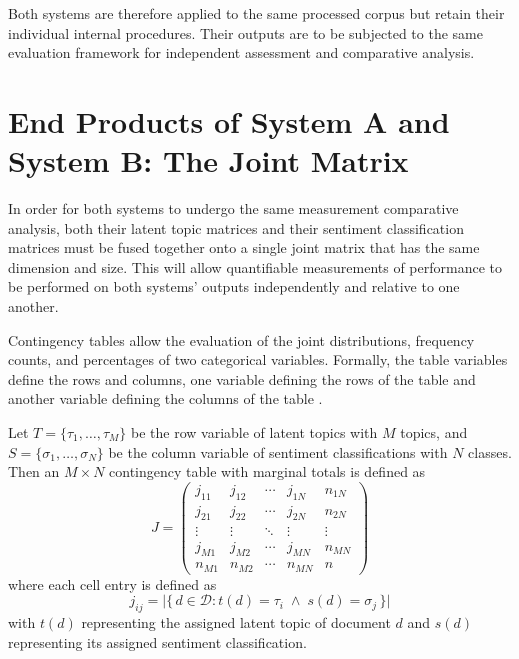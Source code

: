 \documentclass[12pt,a4paper]{report}
\newcommand{\topic}[1]{\tau_{#1}}
\newcommand{\sent}[1]{\sigma_{#1}}
\begin{document}
Both systems are therefore applied to the same processed corpus but retain their
individual internal procedures. Their outputs are to be subjected to the same
evaluation framework for independent assessment and comparative analysis.

\section{End Products of System A and System B: The Joint Matrix}

In order for both systems to undergo the same measurement comparative analysis,
both their latent topic matrices and their sentiment classification matrices
must be fused together onto a single joint matrix that has the same dimension
and size. This will allow quantifiable measurements of performance to be
performed on both systems' outputs independently and relative to one another.

Contingency tables allow the evaluation of the joint distributions, frequency
counts, and percentages of two categorical variables. Formally, the table
variables define the rows and columns, one variable defining the rows of the
table and another variable defining the columns of the table \parencite{ncssnd}.

Let $T = \{\topic{1}, \dots, \topic{M}\}$ be the row variable of latent topics
with $M$ topics, and $S = \{\sent{1}, \dots, \sent{N}\}$ be the column variable
of sentiment classifications with $N$ classes. Then an $M \times N$ contingency
table with marginal totals is defined as
\begin{equation}
  J =
  \begin{pmatrix}
    j_{11}   & j_{12}   & \cdots & j_{1N}   & n_{1N} \\
    j_{21}   & j_{22}   & \cdots & j_{2N}   & n_{2N} \\
    \vdots   & \vdots   & \ddots & \vdots   & \vdots \\
    j_{M1}   & j_{M2}   & \cdots & j_{MN}   & n_{MN} \\
    n_{M1}      & n_{M2}      & \cdots & n_{MN}      & n
  \end{pmatrix}
  \label{eq:jointmatrix}
\end{equation}
where each cell entry is defined as
\begin{equation}
  j_{ij} = \bigl|\{\, d \in \mathcal{D} : t(d) = \topic{i} \;\wedge\; s(d) = \sent{j} \,\}\bigr|
  \label{eq:cellentry}
\end{equation}
with $t(d)$ representing the assigned latent topic of document $d$ and $s(d)$
representing its assigned sentiment classification.
\end{document}
